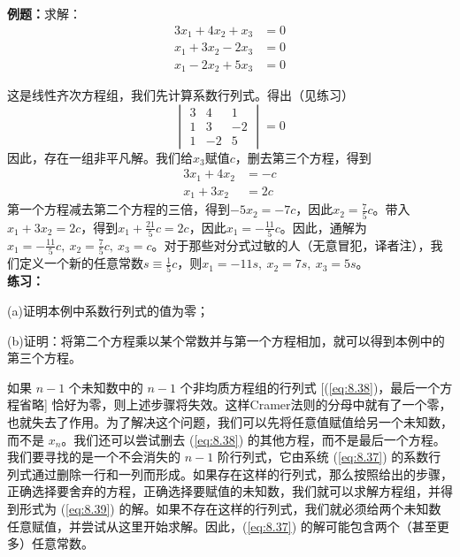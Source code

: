    \begin{examplebox}
        \textbf{例题：}求解：
        \begin{equation*}
            \begin{aligned}
                3x_1 + 4x_2 + x_3 &= 0 \\
                x_1 + 3x_2 - 2x_3 &= 0 \\
                x_1 - 2x_2 + 5x_3 &= 0
            \end{aligned}
        \end{equation*}

        这是线性齐次方程组，我们先计算系数行列式。得出（见练习）
        \begin{equation*}
            \begin{vmatrix}
                3 & 4 & 1 \\
                1 & 3 & -2 \\
                1 & -2 & 5
            \end{vmatrix} = 0
        \end{equation*}
        因此，存在一组非平凡解。我们给$x_3$赋值$c$，删去第三个方程，得到
        \begin{equation*}
            \begin{aligned}
                3x_1 + 4x_2 &= -c \\
                x_1 + 3x_2 &= 2c
            \end{aligned}
        \end{equation*}
        第一个方程减去第二个方程的三倍，得到$-5x_2 = -7c$，因此$x_2 = \frac{7}{5}c$。带入$x_1+3x_2 = 2c$，得到$x_1 +\frac{21}{5}c = 2c$，因此$x_1 = -\frac{11}{5}c$。因此，通解为$x_1 = -\frac{11}{5}c, \: x_2 = \frac{7}{5}c, \: x_3 = c$。对于那些对分式过敏的人（无意冒犯，译者注），我们定义一个新的任意常数$s \equiv \frac{1}{5}c$，则$x_1 = -11s, \: x_2 = 7s, \: x_3 = 5s$。
        \\

        \textbf{练习：}

        (a)证明本例中系数行列式的值为零；

        (b)证明：将第二个方程乘以某个常数并与第一个方程相加，就可以得到本例中的第三个方程。
    \end{examplebox}

    如果 $n-1$ 个未知数中的 $n-1$ 个非均质方程组的行列式 [(\ref{eq:8.38})，最后一个方程省略] 恰好为零，则上述步骤将失效。这样Cramer法则的分母中就有了一个零，也就失去了作用。为了解决这个问题，我们可以先将任意值赋值给另一个未知数，而不是 $x_n$。我们还可以尝试删去 (\ref{eq:8.38}) 的其他方程，而不是最后一个方程。我们要寻找的是一个不会消失的 $n-1$ 阶行列式，它由系统 (\ref{eq:8.37}) 的系数行列式通过删除一行和一列而形成。如果存在这样的行列式，那么按照给出的步骤，正确选择要舍弃的方程，正确选择要赋值的未知数，我们就可以求解方程组，并得到形式为 (\ref{eq:8.39}) 的解。如果不存在这样的行列式，我们就必须给两个未知数任意赋值，并尝试从这里开始求解。因此，(\ref{eq:8.37}) 的解可能包含两个（甚至更多）任意常数。

